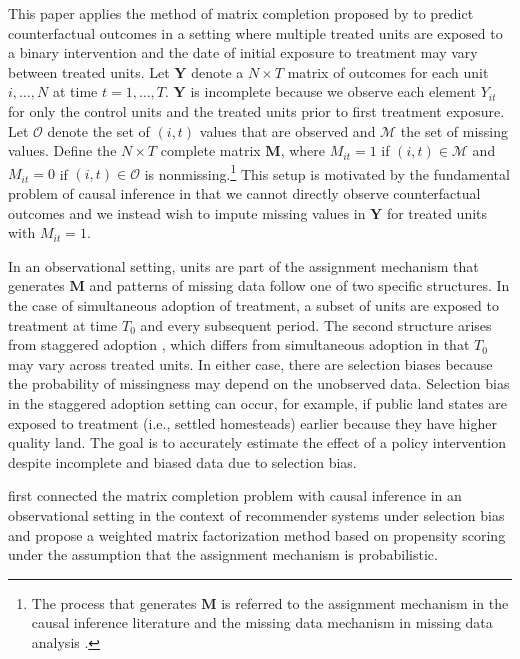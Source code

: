 \documentclass[12pt]{article}
\begin{document}
This paper applies the method of matrix completion proposed by \citet{athey2017matrix} to predict counterfactual outcomes in a setting where multiple treated units are exposed to a binary intervention and the date of initial exposure to treatment may vary between treated units. Let $\mathbf{Y}$ denote a $N \times T$ matrix of outcomes for each unit $i, \ldots, N$ at time $t = 1, \ldots, T$. $\mathbf{Y}$ is incomplete because we observe each element $Y_{it}$ for only the control units and the treated units prior to first treatment exposure. Let $\mathcal{O}$ denote the set of $(i,t)$ values that are observed and $\mathcal{M}$ the set of missing values. Define the $N \times T$ complete matrix $\mathbf{M}$, where $M_{it} =1 $ if $(i,t) \in \mathcal{M}$ and $M_{it} = 0$ if $(i,t) \in \mathcal{O}$ is nonmissing.\footnote{The process that generates $\mathbf{M}$ is referred to the assignment mechanism in the causal inference literature \citep{imbens2015causal} and the missing data mechanism in missing data analysis \citep[Chap.~1]{little2014}.} This setup is motivated by the fundamental problem of causal inference \citep{holland1986statistics} in that we cannot directly observe counterfactual outcomes and we instead wish to impute missing values in $\mathbf{Y}$ for treated units with $M_{it}=1$. 

In an observational setting, units are part of the assignment mechanism that generates $\mathbf{M}$ and patterns of missing data follow one of two specific structures. In the case of simultaneous adoption of treatment, a subset of units are exposed to treatment at time $T_0$ and every subsequent period. The second structure arises from staggered adoption \citep{athey2018design}, which differs from simultaneous adoption in that $T_0$ may vary across treated units. In either case, there are selection biases because the probability of missingness may depend on the unobserved data. Selection bias in the staggered adoption setting can occur, for example, if public land states are exposed to treatment (i.e., settled homesteads) earlier because they have higher quality land. The goal is to accurately estimate the effect of a policy intervention despite incomplete and biased data due to selection bias. 

\citet{schnabel2016recommendations} first connected the matrix completion problem with causal inference in an observational setting in the context of recommender systems under selection bias and propose a weighted matrix factorization method based on propensity scoring under the assumption that the assignment mechanism is probabilistic.
\end{document}
